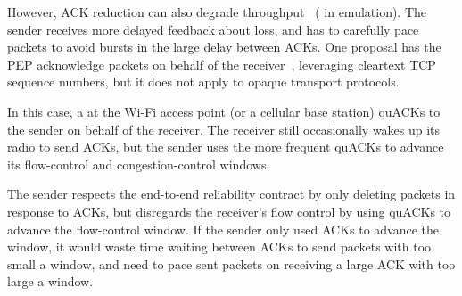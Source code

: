 However, ACK reduction can also degrade throughput~\cite{custura2023reducing,custura2020impact}
( in emulation).
The sender receives more delayed feedback about loss, and has to carefully
pace packets to avoid bursts in the large delay between ACKs.
One proposal has the PEP acknowledge packets on behalf of the
receiver~\cite{kliazovich2012arqproxy}, leveraging cleartext TCP sequence
numbers, but it does not apply to opaque transport protocols.

In this case, a \sys at the Wi-Fi access point (or a cellular base station)
quACKs to the sender on behalf of the receiver.
The receiver still occasionally wakes up its radio to send ACKs,
but the sender uses the more frequent quACKs to advance its flow-control and
congestion-control windows.

The sender respects the end-to-end reliability contract by only deleting
packets in response to ACKs, but disregards the receiver's flow control
by using quACKs to advance the flow-control window.
If the sender only used ACKs to advance the window,
it would waste time waiting between ACKs to send packets with too small a
window, and need to pace sent packets on receiving a large ACK with too large a
window.
